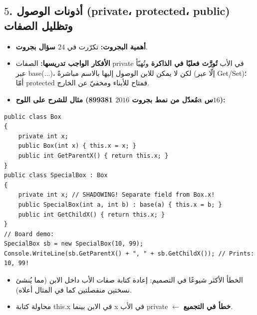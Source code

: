 \documentclass[14pt]{extarticle}
\begin{document}
\filbreak
\subsection*{$5$. أذونات الوصول (\textenglish{private}، \textenglish{protected}، \textenglish{public}) وتظليل الصفات}
\begin{itemize}[itemsep=0.25em]
    \item \textbf{أهمية البجروت:} تكرّرت في \textbf{$24$ سؤال بجروت}.
    \item \textbf{الأفكار الواجب تدريسها:} الصفات \textenglish{private} في الأب \textbf{تُورَّث فعليًا في الذاكرة} وتُهيّأ عبر \textenglish{base(...)}، لكن لا يمكن للابن الوصول إليها بالاسم مباشرةً (إلّا عبر \textenglish{Get}/\textenglish{Set})؛ أمّا \textenglish{protected} فمتاح للأبناء ومخفيّ عن الخارج.
    \item \textbf{مثال للشرح على اللوح (مُعدّل من نمط بجروت $2016$ \textenglish{899381a} س$16$):}
\end{itemize}
\begin{boxCode}
\begin{english}
\begin{verbatim}
public class Box
{
    private int x;
    public Box(int x) { this.x = x; }
    public int GetParentX() { return this.x; }
}
public class SpecialBox : Box
{
    private int x; // SHADOWING! Separate field from Box.x!
    public SpecialBox(int a, int b) : base(a) { this.x = b; }
    public int GetChildX() { return this.x; }
}
// Board demo:
SpecialBox sb = new SpecialBox(10, 99);
Console.WriteLine(sb.GetParentX() + ", " + sb.GetChildX()); // Prints: 10, 99!
\end{verbatim}
\end{english}
\end{boxCode}
\begin{boxWarning}
\begin{itemize}
    \item الخطأ الأكثر شيوعًا في التصميم: إعادة كتابة صفات الأب داخل الابن (مما يُنشئ نسختين منفصلتين كما في المثال أعلاه).
    \item محاولة كتابة \textenglish{this.x} في الابن بينما \textenglish{x} في الأب \textenglish{private} $\leftarrow$ \textbf{خطأ في التجميع}.
\end{itemize}
\end{boxWarning}

\filbreak
\end{document}
